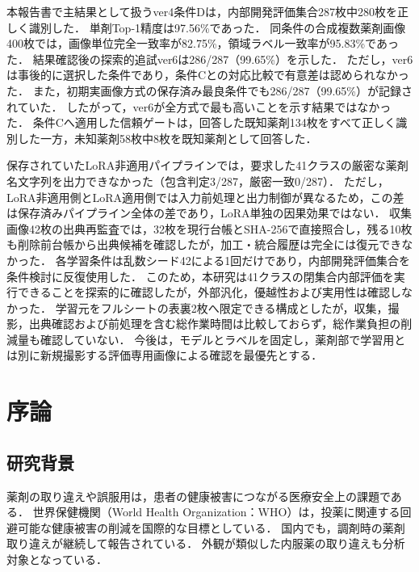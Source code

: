 \documentclass[uplatex,dvipdfmx]{jsarticle}
\begin{document}
本報告書で主結果として扱うver4条件Dは，内部開発評価集合287枚中280枚を正しく識別した．
単剤Top-1精度は97.56\%であった．
同条件の合成複数薬剤画像400枚では，画像単位完全一致率が82.75\%，領域ラベル一致率が95.83\%であった．
結果確認後の探索的追試ver6は286/287（99.65\%）を示した．
ただし，ver6は事後的に選択した条件であり，条件Cとの対応比較で有意差は認められなかった．
また，初期実画像方式の保存済み最良条件でも286/287（99.65\%）が記録されていた．
したがって，ver6が全方式で最も高いことを示す結果ではなかった．
条件Cへ適用した信頼ゲートは，回答した既知薬剤134枚をすべて正しく識別した一方，未知薬剤58枚中8枚を既知薬剤として回答した．

保存されていたLoRA非適用パイプラインでは，要求した41クラスの厳密な薬剤名文字列を出力できなかった（包含判定3/287，厳密一致0/287）．
ただし，LoRA非適用側とLoRA適用側では入力前処理と出力制御が異なるため，この差は保存済みパイプライン全体の差であり，LoRA単独の因果効果ではない．
収集画像42枚の出典再監査では，32枚を現行台帳とSHA-256で直接照合し，残る10枚も削除前台帳から出典候補を確認したが，加工・統合履歴は完全には復元できなかった．
各学習条件は乱数シード42による1回だけであり，内部開発評価集合を条件検討に反復使用した．
このため，本研究は41クラスの閉集合内部評価を実行できることを探索的に確認したが，外部汎化，優越性および実用性は確認しなかった．
学習元をフルシートの表裏2枚へ限定できる構成としたが，収集，撮影，出典確認および前処理を含む総作業時間は比較しておらず，総作業負担の削減量も確認していない．
今後は，モデルとラベルを固定し，薬剤部で学習用とは別に新規撮影する評価専用画像による確認を最優先とする．

\newpage

{\small
\tableofcontents
}
\clearpage
\setcounter{page}{1}
\pagestyle{plain}

\section{序論}

\subsection{研究背景}

薬剤の取り違えや誤服用は，患者の健康被害につながる医療安全上の課題である．
世界保健機関（World Health Organization：WHO）は，投薬に関連する回避可能な健康被害の削減を国際的な目標としている\cite{who_medication}．
国内でも，調剤時の薬剤取り違えが継続して報告されている\cite{jcqhc_hiyari}．
外観が類似した内服薬の取り違えも分析対象となっている\cite{jcqhc_similarity}．
\end{document}
